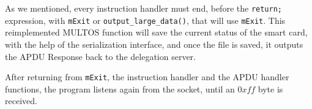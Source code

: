 As we mentioned, every instruction handler must end, before the \texttt{return;} expression, with \texttt{mExit} or  \texttt{output\_large\_data()}, that will use \texttt{mExit}. This reimplemented MULTOS function will save the current status of the smart card, with the help of the serialization interface, and once the file is saved, it outputs the APDU Response back to the delegation server.

After returning from \texttt{mExit}, the instruction handler and the APDU handler functions, the program listens again from the socket, until an $0xff$ byte is received.








